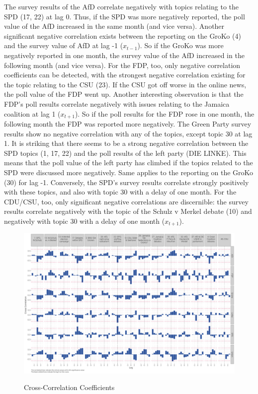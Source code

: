 \documentclass[12pt,a4paper,notitlepage]{article}
\begin{document}
The survey results of the AfD correlate negatively with topics relating to the SPD (17, 22) at lag 0. Thus, if the SPD was more negatively reported, the poll value of the AfD increased in the same month (and vice versa). Another significant negative correlation exists between the reporting on the GroKo (4) and the survey value of AfD at lag -1 ($x_{t-1}$). So if the GroKo was more negatively reported in one month, the survey value of the AfD increased in the following month (and vice versa). For the FDP, too, only negative correlation coefficients can be detected, with the strongest negative correlation existing for the topic relating to the CSU (23). If the CSU got off worse in the online news, the poll value of the FDP went up. Another interesting observation is that the FDP's poll results correlate negatively with issues relating to the Jamaica coalition at lag 1 ($x_{t+1}$). So if the poll results for the FDP rose in one month, the following month the FDP was reported more negatively. The Green Party survey results show no negative correlation with any of the topics, except topic 30 at lag 1. It is striking that there seems to be a strong negative correlation between the SPD topics (1, 17, 22) and the poll results of the left party (DIE LINKE). This means that the poll value of the left party has climbed if the topics related to the SPD were discussed more negatively. Same applies to the reporting on the GroKo (30) for lag -1. Conversely, the SPD's survey results correlate strongly positively with these topics, and also with topic 30 with a delay of one month. For the CDU/CSU, too, only significant negative correlations are discernible: the survey results correlate negatively with the topic of the Schulz v Merkel debate (10) and negatively with topic 30 with a delay of one month ($x_{t+1}$). 

\begin{landscape}
\begin{figure}[H]
	\caption{Cross-Correlation Coefficients}
	\begin{center}
			\includegraphics[width=1.3\textwidth,keepaspectratio]{figs/ccf2.png}
			\label{fig_ccf}
	\end{center}
\end{figure} 
\end{landscape}
\end{document}

